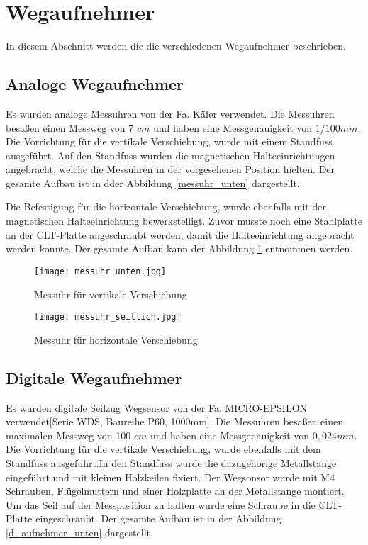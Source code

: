 \documentclass[12 pt,a4 paper ]{scrreprt}
\begin{document}
\section{Wegaufnehmer}	

In diesem Abschnitt werden die die verschiedenen Wegaufnehmer beschrieben.

\subsection{Analoge Wegaufnehmer}

Es wurden analoge Messuhren von der Fa. Käfer verwendet. Die Messuhren besaßen einen Messweg von 7 $cm$ und haben eine Messgenauigkeit von $1/100  mm$. Die Vorrichtung für die vertikale Verschiebung, wurde mit einem Standfuss ausgeführt. Auf den Standfuss wurden die magnetischen Halteeinrichtungen angebracht, welche die Messuhren in der vorgesehenen Position hielten. Der gesamte Aufbau ist in dder Abbildung \ref{messuhr_unten} dargestellt.

Die Befestigung für die horizontale Verschiebung, wurde ebenfalls mit der magnetischen Halteeinrichtung bewerkstelligt. Zuvor musste noch eine Stahlplatte an der CLT-Platte angeschraubt werden, damit die Halteeinrichtung angebracht werden konnte. Der gesamte Aufbau kann der Abbildung \ref{messuhr_seitlich} entnommen werden.

\begin{figure}
\begin{minipage}[h]{6cm}
	\texttt{[image: messuhr\_unten.jpg]}
	\caption{Messuhr für vertikale Verschiebung}
	\label{messuhr_unten}
\end{minipage}
\hfill
\begin{minipage}[h]{7cm}
	\texttt{[image: messuhr\_seitlich.jpg]}
	\caption{Messuhr für horizontale Verschiebung}
	\label{messuhr_seitlich}
\end{minipage}
\end{figure}


\subsection{Digitale Wegaufnehmer}

Es wurden digitale Seilzug Wegsensor von der Fa. MICRO-EPSILON verwendet[Serie WDS, Baureihe P60, 1000mm]. Die Messuhren besaßen einen maximalen Messweg von 100 $cm$ und haben eine Messgenauigkeit von $0,024  mm$. Die Vorrichtung für die vertikale Verschiebung, wurde ebenfalls mit dem Standfuss ausgeführt.In den Standfuss wurde die dazugehörige Metallstange eingeführt und mit kleinen Holzkeilen fixiert. Der  Wegsonsor wurde mit M4 Schrauben, Flügelmuttern und einer Holzplatte an der Metallstange montiert. Um das Seil auf der Messposition zu halten wurde eine Schraube in die CLT-Platte eingeschraubt. Der gesamte Aufbau ist in der Abbildung \ref{d_aufnehmer_unten} dargestellt.
\end{document}
